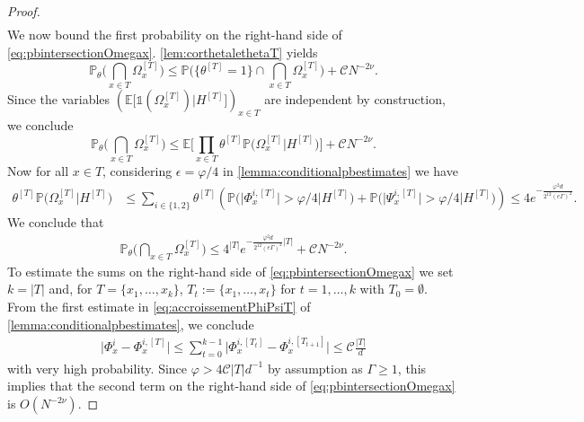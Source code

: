 \documentclass[10pt,a4paper]{amsart}
\newcommand{\abs}[1]{\left| #1 \right|}
\newcommand{\absn}[1]{\bigl| #1 \bigr|} %
\numberwithin{equation}{section}
\newcommand*\bset[1]{[#1]}
\begin{document}
\begin{proof}
\begin{equation}
\begin{aligned}
			\end{aligned}
		\end{equation}
		We now bound the first probability on the right-hand side of \cref{eq:pbintersectionOmegax}. 
		\cref{lem:corthetalethetaT} yields 
		\begin{equation*}
			\mathbb{P}_{\theta}\big( \bigcap_{x \in T} \Omega_x^{\bset{T}} \big) \le \mathbb{P}\big( \{ \theta^{\bset{T}} = 1 \} \cap  \bigcap_{x \in T} \Omega_x^{\bset{T}}\big) + \mathcal{C}N^{-2\nu}.
		\end{equation*}
		Since the variables $(\mathbb{E}\big[ \mathds{1} ( \Omega_{x}^{\bset{T}} ) \big| H^{\bset{T}}\big])_{x \in T}$ are independent by construction, we conclude
		\begin{equation*}
			\mathbb{P}_{\theta}\big( \bigcap_{x \in T} \Omega_x^{\bset{T}} \big) \le \mathbb{E}\big[ \prod_{x \in T} \theta^{\bset{T}} \mathbb{P} \big( \Omega_{x}^{\bset{T}}\big| H^{\bset{T}}\big)\big] + \mathcal{C}N^{-2\nu}.
		\end{equation*}
		Now for all $x \in T$, considering $\epsilon = \varphi/4$ in \cref{lemma:conditionalpbestimates} we have
		\begin{align*}
			\theta^{\bset{T}} \mathbb{P} \big( \Omega_{x}^{\bset{T}} \big| H^{\bset{T}}\big) &\le \sum_{i \in \{1,2\}}\theta^{\bset{T}} \left( \mathbb{P} \big(  \absn{\Phi^{i,\bset{T}}_x} > \varphi/4 \big| H^{\bset{T}} \big)+ \mathbb{P} \big(  \absn{\Psi^{i,\bset{T}}_x} > \varphi/4\big| H^{\bset{T}}  \big) \right) \le 4  e^{-\frac{\varphi^2d}{2^{12} (e\Gamma)^2}}. 
		\end{align*}
	 We conclude that
		\begin{align*}
			\mathbb{P}_{\theta}\big( \bigcap_{x \in T} \Omega_x^{\bset{T}} \big) \le 4^{|T|} e^{-\frac{\varphi^2d}{2^{12} (e\Gamma)^2}|T|} + \mathcal{C}N^{-2\nu} .
		\end{align*}
		To estimate the sums on the right-hand side of \cref{eq:pbintersectionOmegax} we set $k= \abs{T}$ and, for $T= \{ x_1,\ldots,x_k\}$, $T_{t}:= \{ x_1,\ldots,x_t\}$ for $t =1, \ldots, k$ with $T_0 = \emptyset$. From the first estimate in \cref{eq:accroissementPhiPsiT} of \cref{lemma:conditionalpbestimates}, we conclude 
		\begin{align*}
			\bigl|\Phi_{x}^{i} - \Phi_{x}^{i,\bset{T}}\bigr| \le \sum_{t=0}^{k-1} \bigl| \Phi_{x}^{i, \bset{T_{t}}} - \Phi_{x}^{i,\bset{T_{t+1}}}\bigr| \le  \mathcal C \frac{\abs{T}}{d}
		\end{align*}
		with very high probability. Since $\varphi> 4 \mathcal C \abs{T}d^{-1}$ by assumption as $\Gamma \geq 1$, this implies that the second term on the right-hand side of \cref{eq:pbintersectionOmegax} is $O(N^{-2\nu})$.
		

\end{proof}
\end{document}
